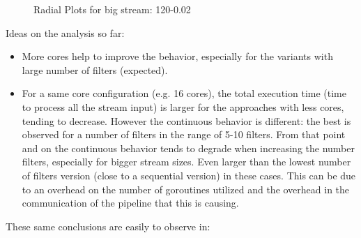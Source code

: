 \documentclass[12pt,a4paper]{article}
\begin{document}
\begin{figure}[H]
    \caption{Radial Plots for big stream: 120-0.02}
    \label{img:exps-read-input-variants}
\end{figure}


Ideas on the analysis so far:

\begin{itemize}
    \item More cores help to improve the behavior, especially for the variants with large number of filters (expected).
    \item For a same core configuration (e.g. 16 cores), the total execution time (time to process all the stream input) is larger for the approaches with less cores, tending to decrease. However the continuous behavior is different: the best is observed for a number of filters in the range of 5-10 filters. From that point and on the continuous behavior tends to degrade when increasing the number filters, especially for bigger stream sizes. Even larger than the lowest number of filters version (close to a sequential version) in these cases. This can be due to an overhead on the number of goroutines utilized and the overhead in the communication of the pipeline that this is causing.
\end{itemize}


These same conclusions are easily to observe in:
\end{document}
